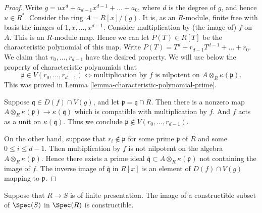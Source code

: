 \begin{proof}
Write $g = ux^d + a_{d-1}x^{d-1} + \ldots + a_0$, where
$d$ is the degree of $g$, and hence $u \in R^*$.
Consider the ring $A = R[x]/(g)$.
It is, as an $R$-module, finite free with basis the images
of $1, x, \ldots, x^{d-1}$. Consider multiplication
by (the image of) $f$ on $A$. This is an $R$-module map.
Hence we can let $P(T) \in R[T]$ be the characteristic polynomial
of this map. Write $P(T) = T^d + r_{d-1} T^{d-1} + \ldots + r_0$.
We claim that $r_0, \ldots, r_{d-1}$ have the desired property.
We will use below the property of characteristic polynomials
that
$$
\mathfrak p \in V(r_0, \ldots, r_{d-1})
\Leftrightarrow
\text{multiplication by }f\text{ is nilpotent on }
A \otimes_R \kappa(\mathfrak p).
$$
This was proved in Lemma \ref{lemma-characteristic-polynomial-prime}.

\medskip\noindent
Suppose $\mathfrak q\in D(f) \cap V(g)$, and let
$\mathfrak p = \mathfrak q \cap R$. Then there is a nonzero map
$A \otimes_R \kappa(\mathfrak p) \to \kappa(\mathfrak q)$ which
is compatible with multiplication by $f$.
And $f$ acts as a unit on $\kappa(\mathfrak q)$.
Thus we conclude $\mathfrak p \not \in  V(r_0, \ldots, r_{d-1})$.

\medskip\noindent
On the other hand, suppose that $r_i \not\in \mathfrak p$ for some
prime $\mathfrak p$ of $R$ and some $0 \leq i \leq d - 1$.
Then multiplication by $f$ is not nilpotent on the algebra
$A \otimes_R \kappa(\mathfrak p)$.
Hence there exists a prime ideal $\overline{\mathfrak q} \subset
A \otimes_R \kappa(\mathfrak p)$ not containing the image of $f$.
The inverse image of $\overline{\mathfrak q}$ in $R[x]$
is an element of $D(f) \cap V(g)$ mapping to $\mathfrak p$.
\end{proof}

\begin{theorem}
\label{theorem-chevalley}
Suppose that $R \to S$ is of finite presentation.
The image of a constructible subset of
$\Spec(S)$ in $\Spec(R)$ is constructible.
\end{theorem}

